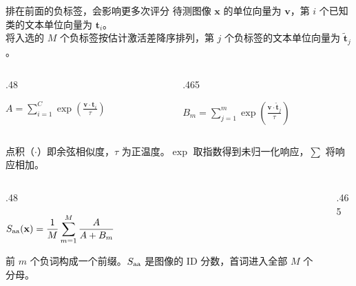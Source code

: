 \begin{frame}[t]{排在前面的负标签，会影响更多次评分}
  \small 待测图像 $\mathbf x$ 的单位向量为 $\mathbf v$，第 $i$ 个已知类的文本单位向量为 $\mathbf t_i$。\\
  将入选的 $M$ 个负标签按估计激活差降序排列，第 $j$ 个负标签的文本单位向量为 $\widetilde{\mathbf t}_j$。
  \par\vspace{1.6mm}
  \begin{columns}[T,onlytextwidth]
    \begin{column}{.48\linewidth}\centering
      \par\vspace{.6mm}
      $\displaystyle A=\sum_{i=1}^{C}
        \exp\!\left(\frac{\mathbf v\cdot\mathbf t_i}{\tau}\right)$\par
    \end{column}
    \begin{column}{.465\linewidth}\centering
      \par\vspace{.6mm}
      $\displaystyle B_m=\sum_{j=1}^{m}
        \exp\!\left(\frac{\mathbf v\cdot\widetilde{\mathbf t}_j}{\tau}\right)$\par
    \end{column}
  \end{columns}
  \par\vspace{1.6mm}
  \small 点积（$\cdot$）即余弦相似度，$\tau$ 为正温度。$\exp$ 取指数得到未归一化响应，$\sum$ 将响应相加。
  \par\vspace{2mm}
  \begin{columns}[T,onlytextwidth]
    \begin{column}{.48\linewidth}
      \par\vspace{.7mm}
      $\displaystyle S_{\mathrm{aa}}(\mathbf x)=\frac{1}{M}
         \sum_{m=1}^{M}\frac{A}{A+B_m}$\par\vspace{1mm}
      \small 前 $m$ 个负词构成一个前缀。$S_{\mathrm{aa}}$ 是图像的 ID 分数，首词进入全部 $M$ 个分母。
    \end{column}
    \begin{column}{.465\linewidth}
      \par

\end{column}
\end{columns}
\end{frame}
